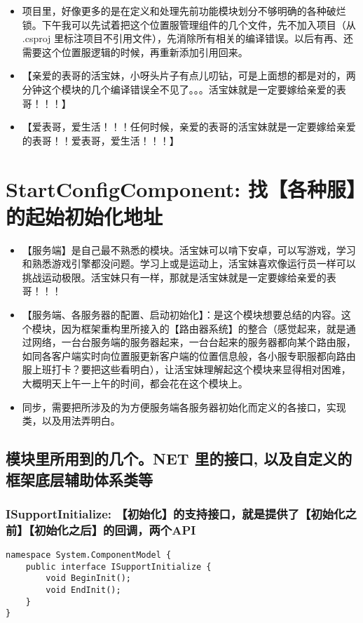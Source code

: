 \documentclass[9pt, b5paper]{article}
\begin{document}
\begin{itemize}
\item 项目里，好像更多的是在定义和处理先前功能模块划分不够明确的各种破烂锁。下午我可以先试着把这个位置服管理组件的几个文件，先不加入项目（从 .csproj 里标注项目不引用文件），先消除所有相关的编译错误。以后有再、还需要这个位置服逻辑的时候，再重新添加引用回来。
\item 【亲爱的表哥的活宝妹，小呀头片子有点儿叨钻，可是上面想的都是对的，两分钟这个模块的几个编译错误全不见了。。。活宝妹就是一定要嫁给亲爱的表哥！！！】
\item 【爱表哥，爱生活！！！任何时候，亲爱的表哥的活宝妹就是一定要嫁给亲爱的表哥！！爱表哥，爱生活！！！】
\end{itemize}

\section{StartConfigComponent: 找【各种服】的起始初始化地址}
\label{sec-6}
\begin{itemize}
\item 【服务端】是自己最不熟悉的模块。活宝妹可以啃下安卓，可以写游戏，学习和熟悉游戏引擎都没问题。学习上或是运动上，活宝妹喜欢像运行员一样可以挑战运动极限。活宝妹只有一样，那就是活宝妹就是一定要嫁给亲爱的表哥！！！
\item 【服务端、各服务器的配置、启动初始化】：是这个模块想要总结的内容。这个模块，因为框架重构里所接入的【路由器系统】的整合（感觉起来，就是通过网络，一台台服务端的服务器起来，一台台起来的服务器都向某个路由服，如同各客户端实时向位置服更新客户端的位置信息般，各小服专职服都向路由服上班打卡？要把这些看明白），让活宝妹理解起这个模块来显得相对困难，大概明天上午一上午的时间，都会花在这个模块上。
\item 同步，需要把所涉及的为方便服务端各服务器初始化而定义的各接口，实现类，以及用法弄明白。
\end{itemize}
\subsection{模块里所用到的几个。NET 里的接口, 以及自定义的框架底层辅助体系类等}
\label{sec-6-1}
\subsubsection{ISupportInitialize: 【初始化】的支持接口，就是提供了【初始化之前】【初始化之后】的回调，两个API}
\label{sec-6-1-1}
\begin{verbatim}
namespace System.ComponentModel {
    public interface ISupportInitialize {
        void BeginInit();
        void EndInit();
    }
}
\end{verbatim}
\end{document}
